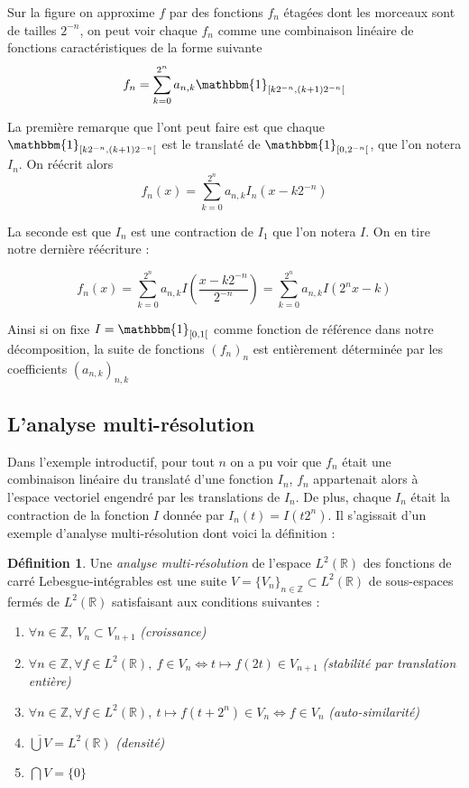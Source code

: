 \documentclass[]{article}
\theoremstyle{remark}
\theoremstyle{definition}
\newtheorem{mydef}{Définition}
\newcommand{\DS}{\displaystyle}
\begin{document}
	\newpage
	
	Sur la figure on approxime $f$ par des fonctions $f_n$ étagées dont les morceaux sont de tailles $2^{-n}$, on peut voir chaque $f_n$ comme une combinaison linéaire de fonctions caractéristiques de la forme suivante $$f_n = \sum_{k = 0}^{2^n} a_{n, k} \mathbbm{1}_{[k 2^{-n}, (k+1)2^{-n}[}$$
	
	La première remarque que l'ont peut faire est que chaque $\mathbbm{1}_{[k 2^{-n}, (k+1)2^{-n}[}$ est le translaté de $\mathbbm{1}_{[0, 2^{-n}[}$, que l'on notera $I_n$. On réécrit alors $$f_n(x) = \sum_{k = 0}^{2^n} a_{n, k} I_n\left(x - k 2^{-n}\right)$$
	
	La seconde est que $I_n$ est une contraction de $I_1$ que l'on notera $I$. On en tire notre dernière réécriture :
	
	$$f_n(x) = \sum_{k = 0}^{2^n} a_{n, k} I \left(\frac{x - k 2^{-n}}{2^{-n}}\right) = \sum_{k = 0}^{2^n} a_{n, k} I \left(2^n x - k\right)$$
	
	Ainsi si on fixe $I = \mathbbm{1}_{[0, 1[}$ comme fonction de référence dans notre décomposition, la suite de fonctions $(f_n)_n$ est entièrement déterminée par les coefficients $(a_{n, k})_{n, k}$
	
	\subsection{L'analyse multi-résolution}
	
	Dans l'exemple introductif, pour tout $n$ on a pu voir que $f_n$ était une combinaison linéaire du translaté d'une fonction $I_n$, $f_n$ appartenait alors à l'espace vectoriel engendré par les translations de $I_n$. De plus, chaque $I_n$ était la contraction de la fonction $I$ donnée par $I_n(t) = I\left(t 2^n\right)$. Il s'agissait d'un exemple d'analyse multi-résolution dont voici la définition :
	
	\begin{mydef}
		Une \textit{analyse multi-résolution} de l'espace $L^2(\mathbb{R})$ des fonctions de carré Lebesgue-intégrables est une suite $V = \{V_n\}_{n \in \mathbb{Z}} \subset L^2(\mathbb{R})$ de sous-espaces fermés de $L^2(\mathbb{R})$ satisfaisant aux conditions suivantes :

		\begin{enumerate}
			\item $\forall n \in \mathbb{Z}, ~ V_{n} \subset V_{n+1}$ \textit{(croissance)}
			\item $\forall n \in \mathbb{Z}, \forall f \in L^2(\mathbb{R}), ~ f \in V_n \Longleftrightarrow t \mapsto f \left(2 t\right) \in V_{n+1}$ \textit{(stabilité par translation entière)}
			\item $\forall n \in \mathbb{Z}, \forall f \in L^2(\mathbb{R}), ~ t \mapsto f \left(t + 2^n\right) \in V_n \Longleftrightarrow f \in V_n$ \textit{(auto-similarité)}
			\item $\DS \overline{\bigcup V} = L^2(\mathbb{R})$ \textit{(densité)}
			\item $\DS \bigcap V = \{0\}$
		\end{enumerate}
	\end{mydef}
	
\end{document}
